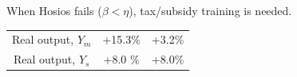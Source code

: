 \documentclass[9pt,xcolor={svgnames}]{beamer}
\begin{document}
\begin{frame}{When Hosios fails ($\beta<\eta$), tax/subsidy training is needed.}
\begin{table}[H]
{\begin{tabular}{||c c  c||}
 Real output, $Y_m$    & +15.3\%  & +3.2\%\\
 Real output, $Y_s$   & +8.0 \% &  +8.0\% \\
 \hline
 \end{tabular}}
 
\end{table} 

\end{frame}




\end{document}

